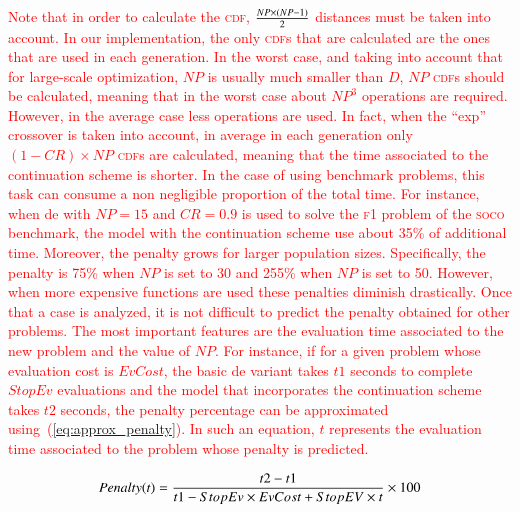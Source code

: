 \documentclass[preprint,3p]{elsarticle}
\newcommand{\DE}{{\sc de}}
\begin{document}
\textcolor{red}{
Note that in order to calculate the \textsc{cdf}, ${{NP \times (NP - 1)}\over{2}}$ distances must be taken into account.
%
In our implementation, the only \textsc{cdf}s that are calculated are the ones that are used in each generation.
%
In the worst case, and taking into account that for large-scale optimization, $NP$ is usually much smaller than $D$, $NP$ \textsc{cdf}s should be calculated,
meaning that in the worst case about $NP^3$ operations are required.
%
However, in the average case less operations are used.
%
In fact, when the ``exp'' crossover is taken into account, in average in each generation only $(1 - CR) \times NP$ \textsc{cdf}s are calculated, meaning
that the time associated to the continuation scheme is shorter.
%
In the case of using benchmark problems, this task can consume a non negligible proportion of the total time.
%
For instance, when \DE{} with $NP = 15$ and $CR = 0.9$ is used to solve the \textsc{f1} problem of the \textsc{soco} benchmark, the model with the continuation
scheme use about 35\% of additional time.
%
Moreover, the penalty grows for larger population sizes.
%
Specifically, the penalty is 75\% when $NP$ is set to 30 and 255\% when $NP$ is set to 50.
%
However, when more expensive functions are used these penalties diminish drastically.
%
Once that a case is analyzed, it is not difficult to predict the penalty obtained for other problems.
%
The most important features are the evaluation time associated to the new problem and the value of $NP$.
%
For instance, if for a given problem whose evaluation cost is $EvCost$, the basic \DE{} variant takes $t1$ seconds to complete $StopEv$ evaluations
and the model that incorporates the continuation scheme takes $t2$ seconds, the penalty percentage can be approximated using~(\ref{eq:approx_penalty}).
%
In such an equation, $t$ represents the evaluation time associated to the problem whose penalty is predicted.
}
%

\begin{equation}
	\label{eq:approx_penalty}
		Penalty(t) = {{t2-t1}\over{t1 -StopEv \times EvCost + StopEV \times t}} \times 100
\end{equation}
\end{document}
